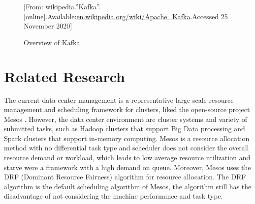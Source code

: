 \documentclass[12pt,oneside,openright,a4paper]{cpe-english-project}
\begin{document}
\begin{figure}[!h]\centering
  \setlength{\fboxrule}{0mm} %
  \setlength{\fboxsep}{0cm}
  \caption{Overview of Kafka.}\label{fig:kafka}
  [From: wikipedia.''Kafka''.[online].Available:\url{en.wikipedia.org/wiki/Apache_Kafka}.Accessed 25 November 2020]
\end{figure}

\section{Related Research}

\hspace{10mm}The current data center management is a representative large-scale resource management and scheduling framework for clusters, liked the open-source project Mesos \cite{mesosInAction}. However, the data center environment are cluster systems and variety of submitted tasks, such as Hadoop clusters that support Big Data processing and Spark clusters that support in-memory computing. Mesos is a resource allocation method with no differential task type and scheduler does not consider the overall resource demand or workload, which leads to low average resource utilization and starve were a framework with a high demand on queue. Moreover, Mesos uses the DRF (Dominant Resource Fairness) algorithm for resource allocation. The DRF algorithm is the default scheduling algorithm of Mesos, the algorithm still has the disadvantage of not considering the machine performance and task type.
\end{document}

